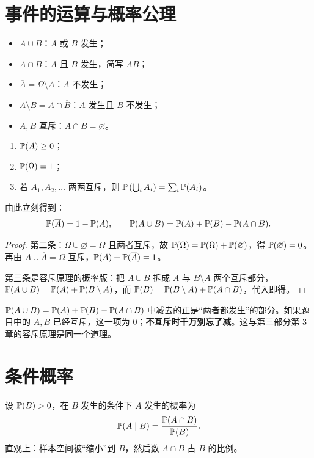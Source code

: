 \section{事件的运算与概率公理}
\begin{definition}[事件的运算]
\begin{itemize}
\item $A\cup B$：$A$ 或 $B$ 发生；
\item $A\cap B$：$A$ 且 $B$ 发生，简写 $AB$；
\item $\overline A=\Omega\setminus A$：$A$ 不发生；
\item $A\setminus B=A\cap\overline B$：$A$ 发生且 $B$ 不发生；
\item $A,B$ \textbf{互斥}：$A\cap B=\varnothing$。
\end{itemize}
\end{definition}

\begin{theorem}[概率的三条公理]
\begin{enumerate}
\item $\mathbb P(A)\ge0$；
\item $\mathbb P(\Omega)=1$；
\item 若 $A_1,A_2,\ldots$ 两两互斥，则 $\mathbb P\left(\bigcup_i A_i\right)=\sum_i\mathbb P(A_i)$。
\end{enumerate}
由此立刻得到：
\[
\mathbb P(\overline A)=1-\mathbb P(A),\qquad
\mathbb P(A\cup B)=\mathbb P(A)+\mathbb P(B)-\mathbb P(A\cap B).
\]
\end{theorem}
\begin{proof}
第二条：$\Omega\cup\varnothing=\Omega$ 且两者互斥，故 $\mathbb P(\Omega)=\mathbb P(\Omega)+\mathbb P(\varnothing)$，得 $\mathbb P(\varnothing)=0$。再由 $A\cup\overline A=\Omega$ 互斥，$\mathbb P(A)+\mathbb P(\overline A)=1$。

第三条是容斥原理的概率版：把 $A\cup B$ 拆成 $A$ 与 $B\setminus A$ 两个互斥部分，$\mathbb P(A\cup B)=\mathbb P(A)+\mathbb P(B\setminus A)$，而 $\mathbb P(B)=\mathbb P(B\setminus A)+\mathbb P(A\cap B)$，代入即得。
\end{proof}

\begin{pitfall}[“或”仍然不是“异或”]
$\mathbb P(A\cup B)=\mathbb P(A)+\mathbb P(B)-\mathbb P(A\cap B)$ 中减去的正是“两者都发生”的部分。如果题目中的 $A,B$ 已经互斥，这一项为 $0$；\textbf{不互斥时千万别忘了减}。这与第三部分第 3 章的容斥原理是同一个道理。
\end{pitfall}

\section{条件概率}
\begin{definition}[条件概率]
设 $\mathbb P(B)>0$，在 $B$ 发生的条件下 $A$ 发生的概率为
\[
\mathbb P(A\mid B)=\frac{\mathbb P(A\cap B)}{\mathbb P(B)}.
\]
直观上：样本空间被“缩小”到 $B$，然后数 $A\cap B$ 占 $B$ 的比例。
\end{definition}

